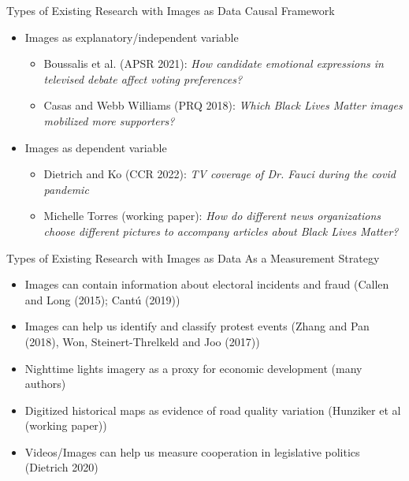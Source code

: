   
  \begin{frame}{Types of Existing Research with Images as Data}
  \large{Causal Framework}
  
  \begin{itemize}
      \item Images as explanatory/independent variable
      \begin{itemize}
          \item Boussalis et al. (APSR 2021): \textit{How candidate emotional expressions in televised debate affect voting preferences?}
          \vspace*{0.2cm}
          \item Casas and Webb Williams (PRQ 2018):\textit{ Which Black Lives Matter images mobilized more supporters?}
      \end{itemize}
      \vspace*{0.5cm}
      \item Images as dependent variable
      \begin{itemize}
          \item Dietrich and Ko (CCR 2022): \textit{TV coverage of Dr. Fauci during the covid pandemic}
          \vspace*{0.2cm}
          \item Michelle Torres (working paper): \textit{How do different news organizations choose different pictures to accompany articles about Black Lives Matter?}
      \end{itemize}
  \end{itemize}
  
  \end{frame}
  
  \begin{frame}{Types of Existing Research with Images as Data}
  \large{As a Measurement Strategy}
  
  \begin{itemize}
      \setlength\itemsep{0.2cm} 
      \item Images can contain information about electoral incidents and fraud (Callen and Long (2015); Cant\'{u} (2019))
      
      \item Images can help us identify and classify protest events (Zhang and Pan (2018), Won, Steinert-Threlkeld and Joo (2017))
      
      \item Nighttime lights imagery as a proxy for economic development (many authors)
      
      \item Digitized historical maps as evidence of road quality variation (Hunziker et al (working paper))
      
      \item Videos/Images can help us measure cooperation in legislative politics (Dietrich 2020)
  \end{itemize}
  
  \end{frame}
  

